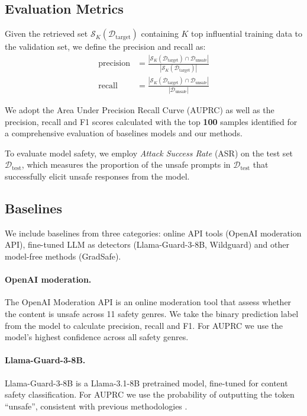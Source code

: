 \documentclass[11pt]{article}
\begin{document}
\subsection{Evaluation Metrics}
Given the retrieved set $\mathcal{S}_{K}(\mathcal{D}_{\text{target}})$ containing $K$ top influential training data to the validation set, we define the precision and recall as: 
\begin{align*}
\text{precision} &= \frac{|\mathcal{S}_{K}(\mathcal{D}_{\text{target}}) \cap \mathcal{D}_{\text{unsafe}}|}{|\mathcal{S}_{K}(\mathcal{D}_{\text{target}})|}  \\
\text{recall} & = \frac{|\mathcal{S}_{K}(\mathcal{D}_{\text{target}}) \cap \mathcal{D}_{\text{unsafe}}|}{|\mathcal{D}_{\text{unsafe}}|}
\end{align*}

We adopt the Area Under Precision Recall Curve (AUPRC) as well as the precision, recall and F1 scores calculated with the top \textbf{100} samples identified for a comprehensive evaluation of baselines models and our methods.

To evaluate model safety, we employ \textit{Attack Success Rate} (ASR) on the test set $\mathcal{D}_{\text{test}}$, which measures the proportion of the unsafe prompts in $\mathcal{D}_{\text{test}}$ that successfully elicit unsafe responses from the model.

\subsection{Baselines}

We include baselines from three categories: online API tools (OpenAI moderation API), fine-tuned LLM as detectors (Llama-Guard-3-8B, Wildguard) and other model-free methods (GradSafe).

\paragraph{OpenAI moderation.}
The OpenAI Moderation API \cite{markov2023holisticapproachundesiredcontent} is an online moderation tool that assess whether the content is unsafe across 11 safety genres. We take the binary prediction label from the model to calculate precision, recall and F1. For AUPRC we use the model's highest confidence across all safety genres.

\paragraph{Llama-Guard-3-8B.}
Llama-Guard-3-8B \cite{dubey2024llama3herdmodels} is a Llama-3.1-8B pretrained model, fine-tuned for content safety classification. For AUPRC we use the probability of outputting the token ``unsafe'', consistent with previous methodologies \cite{xie2024gradsafedetectingjailbreakprompts}.
\end{document}
